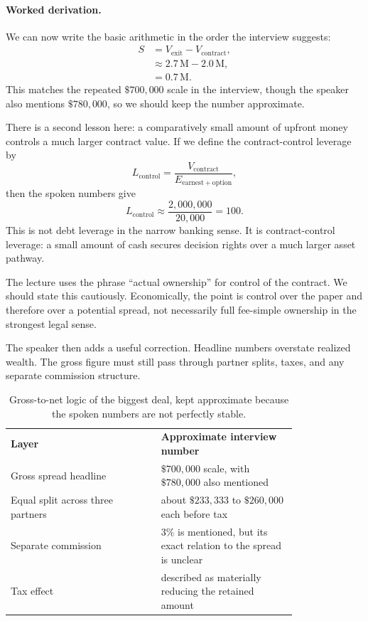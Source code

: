 \paragraph{Worked derivation.}
We can now write the basic arithmetic in the order the interview suggests:
\begin{align}
S &= V_{\mathrm{exit}} - V_{\mathrm{contract}}, \\
&\approx 2.7\,\mathrm{M} - 2.0\,\mathrm{M}, \\
&= 0.7\,\mathrm{M}.
\end{align}
This matches the repeated \(\$700{,}000\) scale in the interview, though the speaker also mentions \(\$780{,}000\), so we should keep the number approximate.

There is a second lesson here: a comparatively small amount of upfront money controls a much larger contract value. If we define the contract-control leverage by
\begin{equation}
L_{\mathrm{control}}
=
\frac{V_{\mathrm{contract}}}{E_{\mathrm{earnest+option}}},
\end{equation}
then the spoken numbers give
\begin{equation}
L_{\mathrm{control}}
\approx
\frac{2{,}000{,}000}{20{,}000}
=100.
\end{equation}
This is not debt leverage in the narrow banking sense. It is contract-control leverage: a small amount of cash secures decision rights over a much larger asset pathway.

\begin{remark}
The lecture uses the phrase ``actual ownership'' for control of the contract. We should state this cautiously. Economically, the point is control over the paper and therefore over a potential spread, not necessarily full fee-simple ownership in the strongest legal sense.
\end{remark}

The speaker then adds a useful correction. Headline numbers overstate realized wealth. The gross figure must still pass through partner splits, taxes, and any separate commission structure.

\begin{table}[h]
\centering
\begin{tabular}{p{0.42\linewidth}p{0.38\linewidth}}
\textbf{Layer} & \textbf{Approximate interview number} \\
Gross spread headline & \(\$700{,}000\) scale, with \(\$780{,}000\) also mentioned \\
Equal split across three partners & about \(\$233{,}333\) to \(\$260{,}000\) each before tax \\
Separate commission & \(3\%\) is mentioned, but its exact relation to the spread is unclear \\
Tax effect & described as materially reducing the retained amount \\
\end{tabular}
\caption{Gross-to-net logic of the biggest deal, kept approximate because the spoken numbers are not perfectly stable.}
\end{table}

